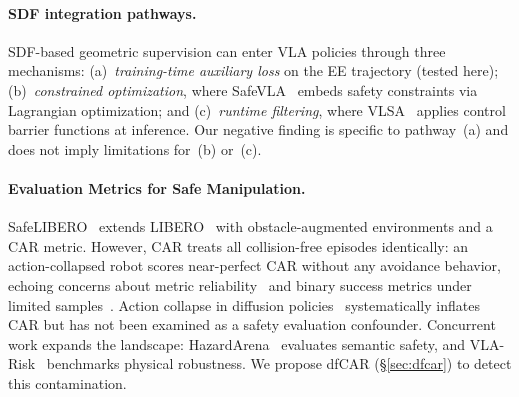 \paragraph{SDF integration pathways.} SDF-based geometric supervision can enter VLA policies through three mechanisms: (a)~\emph{training-time auxiliary loss} on the EE trajectory (tested here); (b)~\emph{constrained optimization}, where SafeVLA~\citep{zhang2025safevla} embeds safety constraints via Lagrangian optimization; and (c)~\emph{runtime filtering}, where VLSA~\citep{hu2025vlsa} applies control barrier functions at inference. Our negative finding is specific to pathway~(a) and does not imply limitations for~(b) or~(c).

\paragraph{Evaluation Metrics for Safe Manipulation.}
SafeLIBERO~\cite{hu2025vlsa} extends LIBERO~\cite{liu2023libero} with obstacle-augmented environments and a CAR metric. However, CAR treats all collision-free episodes identically: an action-collapsed robot scores near-perfect CAR without any avoidance behavior, echoing concerns about metric reliability~\cite{karwowski2024goodhart,gururangan2018annotation} and binary success metrics under limited samples~\cite{snyder2026beyond}. Action collapse in diffusion policies~\cite{dong2025conditioning} systematically inflates CAR but has not been examined as a safety evaluation confounder. Concurrent work expands the landscape: HazardArena~\cite{chen2026hazardarena} evaluates semantic safety, and VLA-Risk~\cite{vlariskanon2026} benchmarks physical robustness. We propose dfCAR (\S\ref{sec:dfcar}) to detect this contamination.
